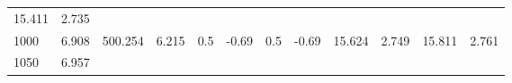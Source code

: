 \documentclass{article}
\begin{document}
\begin{longtable}[]{@{}llllllllllll@{}}
\begin{minipage}[t]{0.06\columnwidth}
15.411\strut
\end{minipage} & \begin{minipage}[t]{0.09\columnwidth}\raggedright\strut
2.735\strut
\end{minipage}\tabularnewline
\begin{minipage}[t]{0.03\columnwidth}\raggedright\strut
1000\strut
\end{minipage} & \begin{minipage}[t]{0.06\columnwidth}\raggedright\strut
6.908\strut
\end{minipage} & \begin{minipage}[t]{0.06\columnwidth}\raggedright\strut
500.254\strut
\end{minipage} & \begin{minipage}[t]{0.08\columnwidth}\raggedright\strut
6.215\strut
\end{minipage} & \begin{minipage}[t]{0.03\columnwidth}\raggedright\strut
0.5\strut
\end{minipage} & \begin{minipage}[t]{0.06\columnwidth}\raggedright\strut
-0.69\strut
\end{minipage} & \begin{minipage}[t]{0.03\columnwidth}\raggedright\strut
0.5\strut
\end{minipage} & \begin{minipage}[t]{0.06\columnwidth}\raggedright\strut
-0.69\strut
\end{minipage} & \begin{minipage}[t]{0.06\columnwidth}\raggedright\strut
15.624\strut
\end{minipage} & \begin{minipage}[t]{0.08\columnwidth}\raggedright\strut
2.749\strut
\end{minipage} & \begin{minipage}[t]{0.06\columnwidth}\raggedright\strut
15.811\strut
\end{minipage} & \begin{minipage}[t]{0.09\columnwidth}\raggedright\strut
2.761\strut
\end{minipage}\tabularnewline
\begin{minipage}[t]{0.03\columnwidth}\raggedright\strut
1050\strut
\end{minipage} & \begin{minipage}[t]{0.06\columnwidth}\raggedright\strut
6.957\strut
\end{minipage} & \begin{minipage}[t]{0.06\columnwidth}\raggedright\strut

\end{minipage}
\end{longtable}
\end{document}
